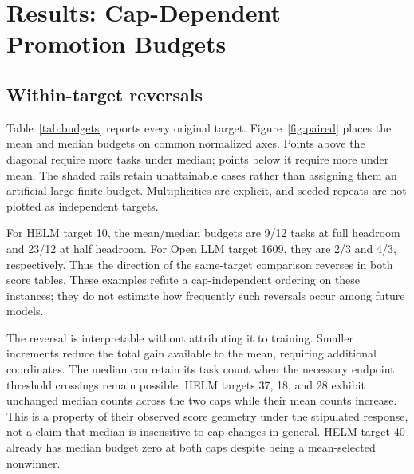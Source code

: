 \documentclass{article}
\begin{document}
\section{Results: Cap-Dependent Promotion Budgets}
\subsection{Within-target reversals}
Table~\ref{tab:budgets} reports every original target. Figure~\ref{fig:paired} places the mean and median budgets on common normalized axes. Points above the diagonal require more tasks under median; points below it require more under mean. The shaded rails retain unattainable cases rather than assigning them an artificial large finite budget. Multiplicities are explicit, and seeded repeats are not plotted as independent targets.

For HELM target 10, the mean/median budgets are 9/12 tasks at full headroom and 23/12 at half headroom. For Open LLM target 1609, they are 2/3 and 4/3, respectively. Thus the direction of the same-target comparison reverses in both score tables. These examples refute a cap-independent ordering on these instances; they do not estimate how frequently such reversals occur among future models.

The reversal is interpretable without attributing it to training. Smaller increments reduce the total gain available to the mean, requiring additional coordinates. The median can retain its task count when the necessary endpoint threshold crossings remain possible. HELM targets 37, 18, and 28 exhibit unchanged median counts across the two caps while their mean counts increase. This is a property of their observed score geometry under the stipulated response, not a claim that median is insensitive to cap changes in general. HELM target 40 already has median budget zero at both caps despite being a mean-selected nonwinner.

\begin{table}[t]
\centering\small
\caption{Minimum selected-task counts on all original targets. $\infty$ means unattainable under the stated cap. Every finite count matches a closed independent reference bound in each recorded seeded execution. Task counts are within-snapshot investments, not calibrated training costs.}
\label{tab:budgets}

\end{table}
\end{document}
